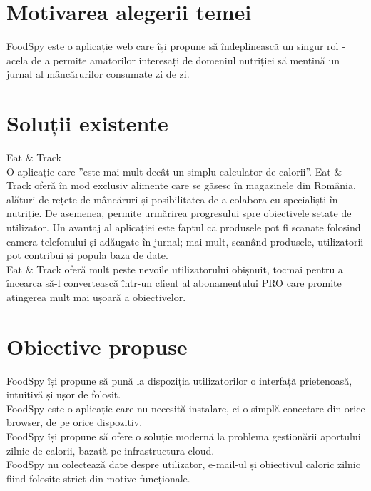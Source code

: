 
\section{Motivarea alegerii temei}
FoodSpy este o aplicație web care își propune să îndeplinească un singur rol - acela de a permite amatorilor interesați de domeniul nutriției să mențină un jurnal al mâncărurilor consumate zi de zi.


\section{Soluții existente}
Eat \& Track
\\
O aplicație care ”este mai mult decât un simplu calculator de calorii”. Eat \& Track oferă în mod exclusiv alimente care se găsesc în magazinele din România, alături de rețete de mâncăruri și posibilitatea de a colabora cu specialiști în nutriție. De asemenea, permite urmărirea progresului spre obiectivele setate de utilizator. Un avantaj al aplicației este faptul că produsele pot fi scanate folosind camera telefonului și adăugate în jurnal; mai mult, scanând produsele, utilizatorii pot contribui și popula baza de date.\\
Eat \& Track oferă mult peste nevoile utilizatorului obișnuit, tocmai pentru a încearca să-l convertească într-un client al abonamentului PRO care promite atingerea mult mai ușoară a obiectivelor.


\section{Obiective propuse}
FoodSpy își propune să pună la dispoziția utilizatorilor o interfață prietenoasă, intuitivă și ușor de folosit.\\
FoodSpy este o aplicație care nu necesită instalare, ci o simplă conectare din orice browser, de pe orice dispozitiv.\\
FoodSpy își propune să ofere o soluție modernă la problema gestionării aportului zilnic de calorii, bazată pe infrastructura cloud.\\
FoodSpy nu colectează date despre utilizator, e-mail-ul și obiectivul caloric zilnic fiind folosite strict din motive funcționale.\\